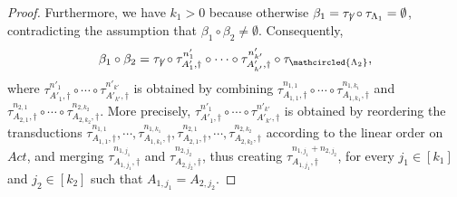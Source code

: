 \begin{proof}
	Furthermore, we have $k_1 > 0$ because otherwise $\beta_1 = \tau_{\not \dag} \circ \tau_{\Lambda_1} = \emptyset$, contradicting the assumption that $\beta_1 \circ \beta_2 \neq \emptyset$. 
	Consequently, 
	$$\beta_1 \circ \beta_2 = 
	\tau_{\not \dag} \circ \tau^{n'_{1}}_{A'_{1}, \dag} \circ \cdots \circ \tau^{n'_{k'}}_{A'_{k'}, \dag} \circ \tau_{\mathcircled{\Lambda_2}},$$
	where $\tau^{n'_{1}}_{A'_{1}, \dag} \circ \cdots \circ \tau^{n'_{k'}}_{A'_{k'}, \dag}$ is obtained by combining 
	$ \tau^{n_{1,1}}_{A_{1,1}, \dag} \circ \cdots \circ \tau^{n_{1, k_1}}_{A_{1, k_1}, \dag}$
	and 
	$ \tau^{n_{2,1}}_{A_{2,1}, \dag} \circ \cdots \circ \tau^{n_{2, k_2}}_{A_{2,k_2}, \dag}$. More precisely, $\tau^{n'_{1}}_{A'_{1}, \dag} \circ \cdots \circ \tau^{n'_{k'}}_{A'_{k'}, \dag}$ is obtained by reordering the transductions $ \tau^{n_{1,1}}_{A_{1,1}, \dag}, \cdots, \tau^{n_{1, k_1}}_{A_{1, k_1}, \dag},  \tau^{n_{2,1}}_{A_{2,1}, \dag}, \cdots, \tau^{n_{2, k_2}}_{A_{2,k_2}, \dag}$ according to the linear order on $Act$,
	and merging $\tau^{n_{1,j_1}}_{A_{1, j_1}, \dag}$ and $\tau^{n_{2, j_2}}_{A_{2, j_2}, \dag}$, thus creating $\tau^{n_{1,j_1} + n_{2, j_2}}_{A_{1, j_1}, \dag}$, for every $j_1 \in [k_1]$ and $j_2 \in [k_2]$ such that $A_{1, j_1} = A_{2, j_2}$.  
	

\end{proof}
